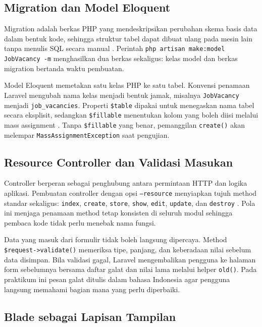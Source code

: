 \documentclass[12pt,a4paper]{article}
\begin{document}
\subsection{Migration dan Model Eloquent}

Migration adalah berkas PHP yang mendeskripsikan perubahan skema basis data dalam bentuk kode, sehingga struktur tabel dapat dibuat ulang pada mesin lain tanpa menulis SQL secara manual \cite{laravel2026migrations}. Perintah \texttt{php artisan make:model JobVacancy -m} menghasilkan dua berkas sekaligus: kelas model dan berkas migration bertanda waktu pembuatan.

Model Eloquent memetakan satu kelas PHP ke satu tabel. Konvensi penamaan Laravel mengubah nama kelas menjadi bentuk jamak, misalnya \texttt{JobVacancy} menjadi \texttt{job\_vacancies}. Properti \texttt{\$table} dipakai untuk menegaskan nama tabel secara eksplisit, sedangkan \texttt{\$fillable} menentukan kolom yang boleh diisi melalui mass assignment \cite{laravel2026eloquent}. Tanpa \texttt{\$fillable} yang benar, pemanggilan \texttt{create()} akan melempar \texttt{MassAssignmentException} saat pengujian.

\subsection{Resource Controller dan Validasi Masukan}

Controller berperan sebagai penghubung antara permintaan HTTP dan logika aplikasi. Pembuatan controller dengan opsi \texttt{--resource} menyiapkan tujuh method standar sekaligus: \texttt{index}, \texttt{create}, \texttt{store}, \texttt{show}, \texttt{edit}, \texttt{update}, dan \texttt{destroy} \cite{laravel2026controllers}. Pola ini menjaga penamaan method tetap konsisten di seluruh modul sehingga pembaca kode tidak perlu menebak nama fungsi.

Data yang masuk dari formulir tidak boleh langsung dipercaya. Method \texttt{\$request->validate()} memeriksa tipe, panjang, dan keberadaan nilai sebelum data disimpan. Bila validasi gagal, Laravel mengembalikan pengguna ke halaman form sebelumnya bersama daftar galat dan nilai lama melalui helper \texttt{old()}. Pada praktikum ini pesan galat ditulis dalam bahasa Indonesia agar pengguna langsung memahami bagian mana yang perlu diperbaiki.

\subsection{Blade sebagai Lapisan Tampilan}
\end{document}

